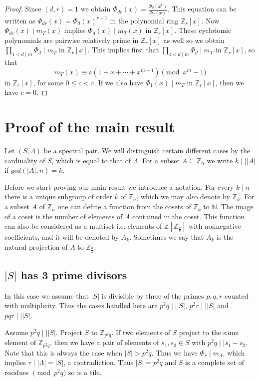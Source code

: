 \documentclass[10pt]{article}
\newcommand{\Z}{\mathbb{Z}}
\newcommand{\La}{\Lambda}
\begin{document}
        \begin{proof}
        Since $(d,r)=1$ we obtain $\Phi_{dr}(x)=\frac{\Phi_d(x^r)}{\Phi_d(x)}$. This equation can be written as $\Phi_{dr}(x)=\Phi_d(x)^{r-1}$ in the polynomial ring $\Z_r[x]$. Now $\Phi_{dr}(x) \mid m_T(x)$ implies $\Phi_d(x) \mid m_T(x)$ in $\Z_r[x]$. These cyclotomic polynomials are pairwise
        relatively prime in $\Z_r[x]$ as well so we obtain $\prod_{1 < d \mid m} \Phi_d \mid m_T$ in $\Z_r[x]$. This implies first that 
        $\prod_{1 <d \mid m} \Phi_d \mid m_T$ in $\mathbb{Z}_r[x]$, so that $$ m_T(x) \equiv c \left( 1+x+ \cdots +x^{m-1} \right) \pmod{x^m-1}$$ in $\Z_r[x]$, for some $0 \le c <r$. If we also have $\Phi_1(x) \mid m_T$ in $\mathbb{Z}_r[x]$, then we have $c=0$.
        \end{proof}
        \section{Proof of the main result} 
        Let $(S, \La)$ be a spectral pair. We will distinguish certain different cases by the cardinality of $S$, which is equal to that of $\La$. For a subset $A \subseteq \Z_n$ we write $k \mid \mid |A|$ if $gcd(|A|,n)=k$.
        
        Before we start proving our main result we introduce a notation. 
        For every $k \mid n$ there is a unique subgroup of order $k$ of $\mathbb{Z}_n$, which we may also denote by $\mathbb{Z}_k$. For a subset $A$ of $\mathbb{Z}_n$ one can define a function from the cosets of $\mathbb{Z}_k$ to $\mathbb{N}$. The image of a coset is the number of elements of $A$ contained in the coset. This function can also be considered as a multiset i.e. elements of $\Z[\Z_{\frac{n}{k}}]$ with nonnegative coefficients, and it will be denoted by $A_k$.
        Sometimes we say that $A_k$ is the natural projection of $A$ to $\mathbb{Z}_{\frac{n}{k}}$.
        \subsection{$|S|$ has 3 prime divisors} 
        In this case we assume that $|S|$ is divisible by three of the primes $p,q,r$ counted with multiplicity. 
        Thus the cases handled here are $p^2q \mid \mid |S|$, $p^2r \mid \mid |S|$ and $pqr \mid \mid |S|$. 
        
        Assume  $p^2q\mid\mid |S|$.  Project $S$ to $\Z_{p^2q}$. If two elements of $S$ project to the same element of $\Z_{p^2q}$, then we have a pair of elements of $s_1, s_2 \in S$ with $p^2q \mid \mid s_1-s_2$. 
        Note that this is always the case when $|S|>p^2q$. Thus we have $\Phi_r \mid m_{\La}$, which implies $r \mid |\La|=|S|$, a contradiction.
        Thus $|S|=p^2q$ and $S$ is a complete set of residues $\pmod{p^2q}$ so is a tile. 
        
\end{document}
